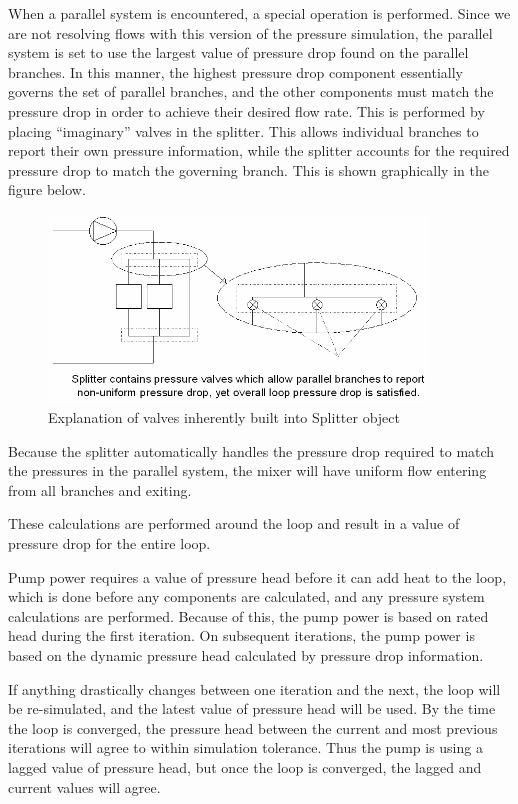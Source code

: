 When a parallel system is encountered, a special operation is performed. Since we are not resolving flows with this version of the pressure simulation, the parallel system is set to use the largest value of pressure drop found on the parallel branches. In this manner, the highest pressure drop component essentially governs the set of parallel branches, and the other components must match the pressure drop in order to achieve their desired flow rate. This is performed by placing ``imaginary'' valves in the splitter. This allows individual branches to report their own pressure information, while the splitter accounts for the required pressure drop to match the governing branch. This is shown graphically in the figure below.

\begin{figure}[hbtp] %
\centering
\includegraphics[width=0.9\textwidth, height=0.9\textheight, keepaspectratio=true]{media/image1978.png}
\caption{Explanation of valves inherently built into Splitter object \protect \label{fig:explanation-of-valves-inherently-built-into}}
\end{figure}

Because the splitter automatically handles the pressure drop required to match the pressures in the parallel system, the mixer will have uniform flow entering from all branches and exiting.

These calculations are performed around the loop and result in a value of pressure drop for the entire loop.

Pump power requires a value of pressure head before it can add heat to the loop, which is done before any components are calculated, and any pressure system calculations are performed. Because of this, the pump power is based on rated head during the first iteration. On subsequent iterations, the pump power is based on the dynamic pressure head calculated by pressure drop information.

If anything drastically changes between one iteration and the next, the loop will be re-simulated, and the latest value of pressure head will be used. By the time the loop is converged, the pressure head between the current and most previous iterations will agree to within simulation tolerance. Thus the pump is using a lagged value of pressure head, but once the loop is converged, the lagged and current values will agree.

